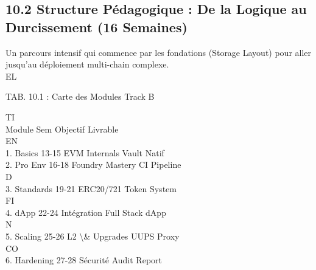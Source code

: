 \subsection{10.2 Structure Pédagogique : De la Logique au Durcissement (16 Semaines)}
Un parcours intensif qui commence par les fondations (Storage Layout) pour aller jusqu’au déploiement multi-chain complexe.\\
\vspace{0.5em}
\vspace{0.5em}
\vspace{0.5em}
\vspace{0.5em}
EL\\
\begin{center}\begin{tabular}TAB. 10.1 : Carte des Modules Track B\end{tabular}\end{center}
\vspace{0.5em}
\vspace{0.5em}
\vspace{0.5em}
\vspace{0.5em}
TI\\
Module       Sem Objectif          Livrable\\
\vspace{0.5em}
\vspace{0.5em}
\vspace{0.5em}
\vspace{0.5em}
EN\\
1. Basics    13-15 EVM Internals   Vault Natif\\
2. Pro Env   16-18 Foundry Mastery CI Pipeline\\
\vspace{0.5em}
\vspace{0.5em}
\vspace{0.5em}
\vspace{0.5em}
D\\
3. Standards 19-21 ERC20/721       Token System\\
\vspace{0.5em}
\vspace{0.5em}
\vspace{0.5em}
\vspace{0.5em}
FI\\
4. dApp      22-24 Intégration     Full Stack dApp\\
\vspace{0.5em}
N\\
5. Scaling   25-26 L2 \textbackslash{}& Upgrades   UUPS Proxy\\
CO\\
6. Hardening 27-28 Sécurité        Audit Report\\
\vspace{0.5em}
\vspace{0.5em}
\vspace{0.5em}
\vspace{0.5em}
